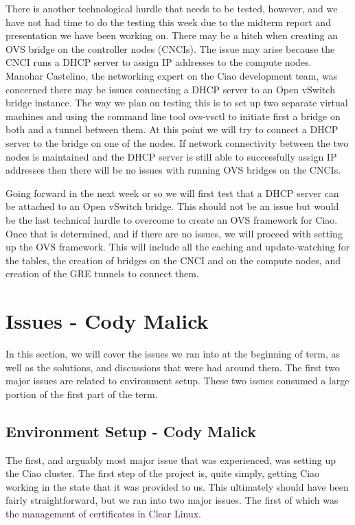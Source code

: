 \documentclass[10pt,onecolumn,journal,draftclsnofoot]{IEEEtran}
\begin{document}
There is another technological hurdle that needs to be tested, however, and we
have not had time to do the testing this week due to the midterm report and
presentation we have been working on. There may be a hitch when creating an OVS
bridge on the controller nodes (CNCIs). The issue may arise because the CNCI
runs a DHCP server to assign IP addresses to the compute nodes. Manohar
Castelino, the networking expert on the Ciao development team, was concerned
there may be issues connecting a DHCP server to an Open vSwitch bridge
instance. The way we plan on testing this is to set up two separate virtual
machines and using the command line tool ovs-vsctl to initiate first a bridge
on both and a tunnel between them. At this point we will try to connect a DHCP
server to the bridge on one of the nodes. If network connectivity between the
two nodes is maintained and the DHCP server is still able to successfully
assign IP addresses then there will be no issues with running OVS bridges on
the CNCIs.

Going forward in the next week or so we will first test that a DHCP server can
be attached to an Open vSwitch bridge. This should not be an issue but would be
the last technical hurdle to overcome to create an OVS framework for Ciao. Once
that is determined, and if there are no issues, we will proceed with setting up
the OVS framework. This will include all the caching and update-watching for
the tables, the creation of bridges on the CNCI and on the compute nodes, and
creation of the GRE tunnels to connect them.

\section{Issues - Cody Malick}
In this section, we will cover the issues we ran into at the beginning of term,
as well as the solutions, and discussions that were had around them. The first
two major issues are related to environment setup. These two issues consumed a
large portion of the first part of the term.

\subsection{Environment Setup - Cody Malick}
The first, and arguably most major issue that was experienced, was setting up
the Ciao cluster. The first step of the project is, quite simply, getting Ciao
working in the state that it was provided to us. This ultimately should have
been fairly straightforward, but we ran into two major issues. The first of
which was the management of certificates in Clear Linux.
\end{document}
